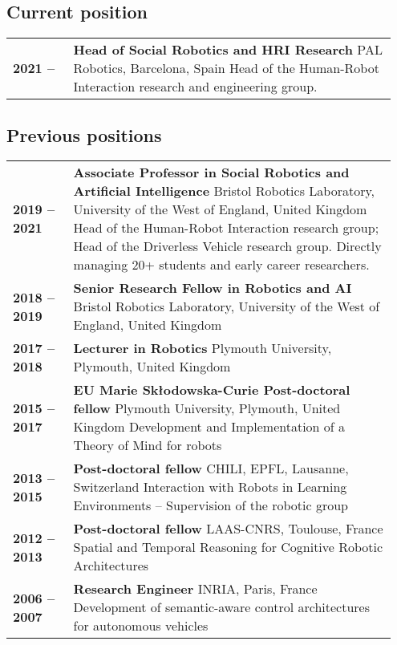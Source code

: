 \subsection{Current position}

\begin{tabular}{p{0.15\linewidth}p{0.8\linewidth}}
    \bf 2021 -- & {\bf Head of Social Robotics and HRI Research}
    \newline PAL Robotics, Barcelona, Spain 
    \newline \small Head of the Human-Robot Interaction research and engineering
    group.\\
\end{tabular}


\subsection{Previous positions}

\begin{tabular}{p{0.15\linewidth}p{0.8\linewidth}}
    \bf 2019 -- 2021 & {\bf Associate Professor in Social Robotics and Artificial
    Intelligence}
    \newline Bristol Robotics Laboratory, University of the West of England,
    United Kingdom 
    \newline \small Head of the Human-Robot Interaction research group; Head of the Driverless Vehicle research group.
Directly managing 20+ students and early career researchers. \\
    \bf 2018 -- 2019 & {\bf Senior Research Fellow in Robotics and AI} \newline Bristol Robotics Laboratory, University of the West of England, United Kingdom \\
    \bf 2017 -- 2018 & {\bf Lecturer in Robotics} \newline Plymouth University, Plymouth, United Kingdom \\
    \bf 2015 -- 2017 & {\bf EU Marie Skłodowska-Curie Post-doctoral fellow}
    \newline Plymouth University, Plymouth, United Kingdom \newline \small
    Development and Implementation of a Theory of Mind for robots \\
    \bf 2013 -- 2015 & {\bf Post-doctoral fellow} \newline CHILI, EPFL,
    Lausanne, Switzerland \newline \small Interaction with Robots in Learning
    Environments – Supervision of the robotic group \\
    \bf 2012 -- 2013 & {\bf Post-doctoral fellow} \newline LAAS-CNRS, Toulouse,
    France \newline \small Spatial and Temporal Reasoning for Cognitive Robotic
    Architectures\\
    \bf 2006 -- 2007 & {\bf Research Engineer} \newline INRIA, Paris, France
    \newline \small Development of semantic-aware control architectures for
    autonomous vehicles \\
\end{tabular}


